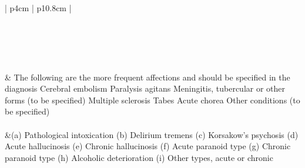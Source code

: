 \begin{longtable}[!t]{ | p{4cm} | p{10.8cm} | }
 \\ \hline
{} \\ \hline
{} \\ \hline
{} \\ \hline
{} \\ \hline
{} \\ \hline
 & The following are the more frequent affections and should be specified in the diagnosis\newline
 Cerebral embolism\newline
 Paralysis agitans\newline
 Meningitis, tubercular or other forms\newline
 (to be specified)\newline
 Multiple sclerosis\newline
 Tabes\newline
 Acute chorea\newline
 Other conditions (to be specified)\newline \\
 \\ \hline
 &(a) Pathological intoxication\newline
(b) Delirium tremens\newline
(c) Korsakow's psychosis\newline
(d) Acute hallucinosis\newline
(e) Chronic hallucinosis\newline
(f) Acute paranoid type\newline
(g) Chronic paranoid type\newline
(h) Alcoholic deterioration\newline
(i) Other types, acute or chronic\newline \\


\end{longtable}
